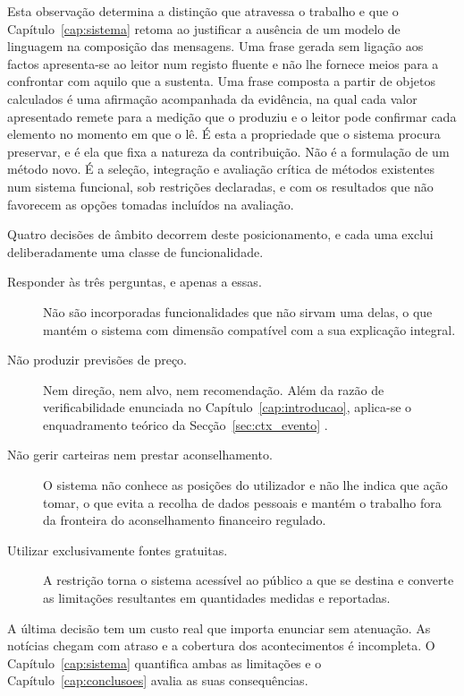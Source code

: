 Esta observação determina a distinção que atravessa o trabalho e que o Capítulo~\ref{cap:sistema}
retoma ao justificar a ausência de um modelo de linguagem na composição das mensagens. Uma frase
gerada sem ligação aos factos apresenta-se ao leitor num registo fluente e não lhe fornece meios para a
confrontar com aquilo que a sustenta. Uma frase composta a partir de objetos calculados é uma
afirmação acompanhada da evidência, na qual cada valor apresentado remete para a medição que o
produziu e o leitor pode confirmar cada elemento no momento em que o lê. É esta a propriedade que o sistema procura preservar, e é ela que fixa a natureza da contribuição.
Não é a formulação de um método novo. É a seleção, integração e avaliação crítica de métodos
existentes num sistema funcional, sob restrições declaradas, e com os resultados que não favorecem
as opções tomadas incluídos na avaliação.

Quatro decisões de âmbito decorrem deste posicionamento, e cada uma exclui deliberadamente uma
classe de funcionalidade.

\begin{description}
  \item[Responder às três perguntas, e apenas a essas.] Não são incorporadas funcionalidades que
        não sirvam uma delas, o que mantém o sistema com dimensão compatível com a sua explicação
        integral.
  \item[Não produzir previsões de preço.] Nem direção, nem alvo, nem recomendação. Além da razão de
        verificabilidade enunciada no Capítulo~\ref{cap:introducao}, aplica-se o enquadramento
        teórico da Secção~\ref{sec:ctx_evento} \autocite{fama1970efficient}.
  \item[Não gerir carteiras nem prestar aconselhamento.] O sistema não conhece as posições do
        utilizador e não lhe indica que ação tomar, o que evita a recolha de dados pessoais e
        mantém o trabalho fora da fronteira do aconselhamento financeiro regulado.
  \item[Utilizar exclusivamente fontes gratuitas.] A restrição torna o sistema acessível ao público
        a que se destina e converte as limitações resultantes em quantidades medidas e reportadas.
\end{description}

A última decisão tem um custo real que importa enunciar sem atenuação. As notícias chegam com
atraso e a cobertura dos acontecimentos é incompleta. O Capítulo~\ref{cap:sistema} quantifica
ambas as limitações e o Capítulo~\ref{cap:conclusoes} avalia as suas consequências.
